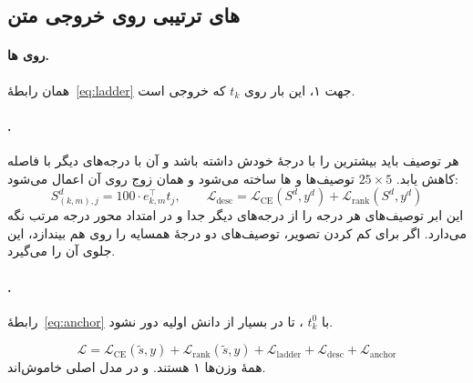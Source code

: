 \subsection{های ترتیبی روی خروجی متن}
\paragraph{ روی ها.} همان رابطهٔ~\ref{eq:ladder} جهت ۱، این بار روی $t_k$ که خروجی  است.

\paragraph{.} هر توصیف باید بیشترین  را با درجهٔ خودش داشته باشد و  آن با درجه‌های دیگر با فاصله کاهش یابد.  $25\times5$ توصیف‌ها و ها ساخته می‌شود و همان زوج   روی آن اعمال می‌شود:
\begin{equation}
S^{d}_{(k,m), j} = 100 \cdot e_{k,m}^{\top} t_j, \qquad \mathcal{L}_{\mathrm{desc}} = \mathcal{L}_{\mathrm{CE}}(S^{d}, y^{d}) + \mathcal{L}_{\mathrm{rank}}(S^{d}, y^{d})
\label{eq:desc}
\end{equation}
این  ابر توصیف‌های هر درجه را از درجه‌های دیگر جدا و در امتداد محور درجه مرتب نگه می‌دارد. اگر  برای کم کردن  تصویر، توصیف‌های دو درجهٔ همسایه را روی هم بیندازد، این  جلوی آن را می‌گیرد.

\paragraph{.} رابطهٔ~\ref{eq:anchor} با $t^{0}_k$ ، تا  در  بسیار  از دانش اولیه دور نشود.

\begin{equation}
\mathcal{L} = \mathcal{L}_{\mathrm{CE}}(\tilde{s}, y) + \mathcal{L}_{\mathrm{rank}}(\tilde{s}, y) + \mathcal{L}_{\mathrm{ladder}} + \mathcal{L}_{\mathrm{desc}} + \mathcal{L}_{\mathrm{anchor}}
\label{eq:d2-loss}
\end{equation}
همهٔ وزن‌ها ۱ هستند.   و  در مدل اصلی خاموش‌اند.

